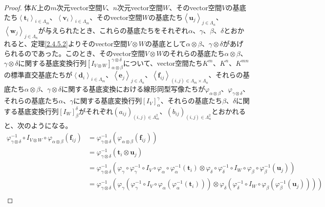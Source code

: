 \documentclass[dvipdfmx]{jsarticle}
\begin{document}
\begin{proof}
体$K$上の$m$次元vector空間$V$、$n$次元vector空間$W$、そのvector空間$V$の基底たち$\left\langle \mathbf{t}_{i} \right\rangle_{i \in \varLambda_{m}}$、$\left\langle \mathbf{v}_{i} \right\rangle_{i \in \varLambda_{m}}$、そのvector空間$W$の基底たち$\left\langle \mathbf{u}_{j} \right\rangle_{j \in \varLambda_{n}}$、$\left\langle \mathbf{w}_{j} \right\rangle_{j \in \varLambda_{n}}$が与えられたとき、これらの基底たちをそれぞれ$\alpha$、$\gamma$、$\beta$、$\delta$とおかれると、定理\ref{2.4.5.2}よりそのvector空間$V \otimes W$の基底として$\alpha \otimes \beta$、$\gamma \otimes \delta$があげられるのであった。このとき、そのvector空間$V \otimes W$のそれらの基底たち$\alpha \otimes \beta$、$\gamma \otimes \delta$に関する基底変換行列$\left[ I_{V \otimes W} \right]^{\gamma \otimes \delta}_{\alpha \otimes \beta}$について、vector空間たち$K^{m}$、$K^{n}$、$K^{mn}$の標準直交基底たちが$\left\langle \mathbf{d}_{i} \right\rangle_{i \in \varLambda_{m}}$、$\left\langle \mathbf{e}_{j} \right\rangle_{j \in \varLambda_{n}}$、$\left\langle \mathbf{f}_{ij} \right\rangle_{(i,j) \in \varLambda_{m} \times \varLambda_{n}}$、それらの基底たち$\alpha \otimes \beta$、$\gamma \otimes \delta$に関する基底変換における線形同型写像たちが$\varphi_{\alpha \otimes \beta}$、$\varphi_{\gamma \otimes \delta}$、それらの基底たち$\alpha$、$\gamma$に関する基底変換行列$\left[ I_{V} \right]^{\gamma}_{\alpha}$、それらの基底たち$\beta$、$\delta$に関する基底変換行列$\left[ I_{W} \right]^{\delta}_{\beta}$がそれぞれ$\left( a_{ij} \right)_{(i,j) \in \varLambda_{m}^{2}}$、$\left( b_{ij} \right)_{(i,j) \in \varLambda_{n}^{2}}$とおかれると、次のようになる。
\begin{align*}
\varphi_{\gamma \otimes \delta}^{- 1} \circ I_{V \otimes W} \circ \varphi_{\alpha \otimes \beta}\left( \mathbf{f}_{ij} \right) &= \varphi_{\gamma \otimes \delta}^{- 1}\left( \varphi_{\alpha \otimes \beta}\left( \mathbf{f}_{ij} \right) \right)\\
&= \varphi_{\gamma \otimes \delta}^{- 1}\left( \mathbf{t}_{i} \otimes \mathbf{u}_{j} \right)\\
&= \varphi_{\gamma \otimes \delta}^{- 1}\left( \varphi_{\gamma} \circ \varphi_{\gamma}^{- 1} \circ I_{V} \circ \varphi_{\alpha} \circ \varphi_{\alpha}^{- 1}\left( \mathbf{t}_{i} \right) \otimes \varphi_{\delta} \circ \varphi_{\delta}^{- 1} \circ I_{W} \circ \varphi_{\beta} \circ \varphi_{\beta}^{- 1}\left( \mathbf{u}_{j} \right) \right)\\
&= \varphi_{\gamma \otimes \delta}^{- 1}\left( \varphi_{\gamma}\left( \varphi_{\gamma}^{- 1} \circ I_{V} \circ \varphi_{\alpha}\left( \varphi_{\alpha}^{- 1}\left( \mathbf{t}_{i} \right) \right) \right) \otimes \varphi_{\delta}\left( \varphi_{\delta}^{- 1} \circ I_{W} \circ \varphi_{\beta}\left( \varphi_{\beta}^{- 1}\left( \mathbf{u}_{j} \right) \right) \right) \right)\\

\end{align*}
\end{proof}
\end{document}
